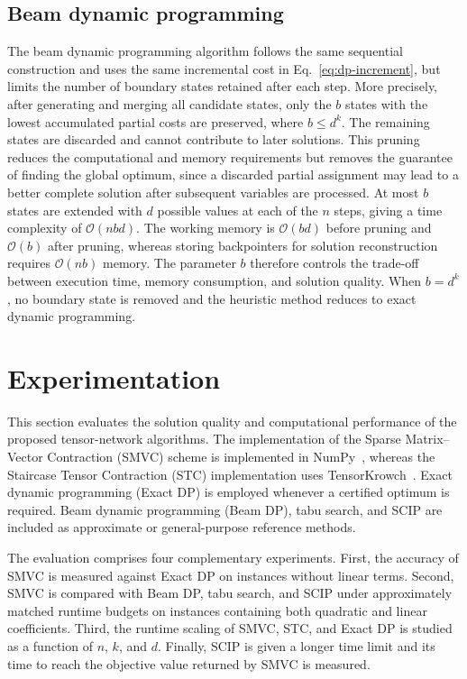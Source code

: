 \documentclass[%
 reprint,
 amsmath,amssymb,
 aps,
 pra,showkeys,
]{revtex4-2}
\begin{document}
\subsection{Beam dynamic programming}\label{sec:beam dynamic programming}
The beam dynamic programming algorithm follows the same sequential construction and
uses the same incremental cost in Eq.~\eqref{eq:dp-increment}, but limits
the number of boundary states retained after each step. More precisely,
after generating and merging all candidate states, only the $b$ states
with the lowest accumulated partial costs are preserved, where
$b\leq d^k$. The remaining states are discarded and cannot contribute
to later solutions. This pruning reduces the computational and memory
requirements but removes the guarantee of finding the global optimum,
since a discarded partial assignment may lead to a better complete
solution after subsequent variables are processed. At most $b$ states
are extended with $d$ possible values at each of the $n$ steps, giving
a time complexity of $\mathcal{O}(nbd)$. The working memory is
$\mathcal{O}(bd)$ before pruning and $\mathcal{O}(b)$ after pruning,
whereas storing backpointers for solution reconstruction requires
$\mathcal{O}(nb)$ memory. The parameter $b$ therefore controls the
trade-off between execution time, memory consumption, and solution
quality. When $b=d^k$, no boundary state is removed and the heuristic
method reduces to exact dynamic programming.

\section{Experimentation}\label{sec:experiments}

This section evaluates the solution quality and computational performance
of the proposed tensor-network algorithms. The implementation of
the Sparse Matrix--Vector Contraction (SMVC) scheme is implemented in
NumPy~\cite{numpy}, whereas the Staircase Tensor Contraction (STC)
implementation uses TensorKrowch~\cite{tensorkrowch}. Exact dynamic
programming (Exact DP) is employed whenever a certified optimum is
required. Beam dynamic programming (Beam DP), tabu search, and SCIP are
included as approximate or general-purpose reference methods.

The evaluation comprises four complementary experiments. First, the
accuracy of SMVC is measured against Exact DP on instances without
linear terms. Second, SMVC is compared with Beam DP, tabu search, and
SCIP under approximately matched runtime budgets on instances containing
both quadratic and linear coefficients. Third, the runtime scaling of
SMVC, STC, and Exact DP is studied as a function of $n$, $k$, and $d$.
Finally, SCIP is given a longer time limit and its time to reach the
objective value returned by SMVC is measured.
\end{document}
